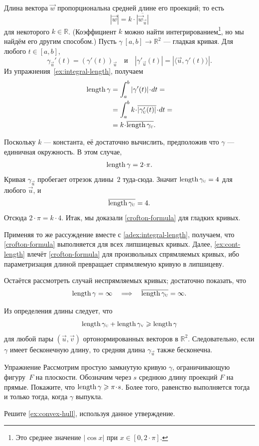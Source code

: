 Длина вектора ${\vec w}$ пропорциональна средней длине его проекций; то есть
\[|{\vec w}|=k\cdot \overline{|{\vec w}_{\vec u}|}\]
для некоторого $k \in \mathbb{R}$.
(Коэффициент $k$ можно найти интегрированием\footnote{Это среднее значение $|\cos x|$ при $x\in [0,2\cdot\pi]$.}, но мы найдём его другим способом.)
Пусть $\gamma\:[a,b]\to\mathbb{R}^2$ --- гладкая кривая.
Для любого $t \in [a,b]$,
\[\gamma_{\vec u}'(t)=(\gamma'(t))_{\vec u}
\quad\text{и}\quad
|\gamma'_{\vec u}(t)|=|\langle\vec u,\gamma'(t)\rangle|.\]
Из упражнения~\ref{ex:integral-length}, получаем
\begin{align*}
\length\gamma
&=\int_a^b|\gamma'(t)|\cdot dt=
\\
&=\int_a^b  k\cdot \overline{|\gamma_{\vec u}'(t)|}\cdot dt=
\\
&=k\cdot \overline{\length\gamma_{\vec u}}.
\end{align*}

Поскольку $k$ --- константа, её достаточно вычислить, предположив что $\gamma$ --- единичная окружность.
В этом случае,
\[\length \gamma=2\cdot\pi.\]
Кривая $\gamma_{\vec u}$ пробегает отрезок длины~$2$ туда-сюда.
Значит $\mathop{\rm length}\nolimits\gamma_{\text{\sc{u}}}=4$ для любого $\vec u$, и 
\[\overline{\mathop{\rm length}\nolimits\gamma_{\text{\sc{u}}}} =4.\]
Отсюда $2\cdot \pi =k\cdot 4$.
Итак, мы доказали \ref{crofton-formula} для гладких кривых.

Применяя то же рассуждение вместе с \ref{adex:integral-length}, получаем, что \ref{crofton-formula} выполняется для всех липшицевых кривых.
Далее, \ref{ex:cont-length} влечёт \ref{crofton-formula} для произвольных спрямляемых кривых,
ибо параметризация длиной превращает спрямляемую кривую в липшицеву.

Остаётся рассмотреть случай неспрямляемых кривых;
достаточно показать, что 
\[\mathop{\rm length}\nolimits\gamma=\infty
\quad\Longrightarrow\quad
\overline{\mathop{\rm length}\nolimits\gamma_{\text{\sc{u}}}}=\infty.
\]

Из определения длины следует, что
\[\mathop{\rm length}\nolimits\gamma_{\text{\sc{u}}}+\mathop{\rm length}\nolimits\gamma_{\text{\sc{v}}}\geqslant \mathop{\rm length}\nolimits\gamma\]
для любой пары $(\vec u , \vec v )$ ортонормированных векторов в $\mathbb{R}^2$.
Следовательно, если $\gamma$ имеет бесконечную длину, то средняя длина $\gamma_{\vec u}$ также бесконечна.
\qeds

\begin{thm}{Упражнение}\label{ex:convex-croftons}
Рассмотрим простую замкнутую кривую $\gamma$, ограничивающую фигуру~$F$ на плоскости.
Обозначим через $s$ среднюю длину проекций $F$ на прямые.
Покажите, что $\length\gamma\ge \pi \cdot s$.
Более того, равенство выполняется тогда и только тогда, когда $\gamma$ выпукла.

Решите \ref{ex:convex-hull}, используя данное утверждение.
\end{thm}

